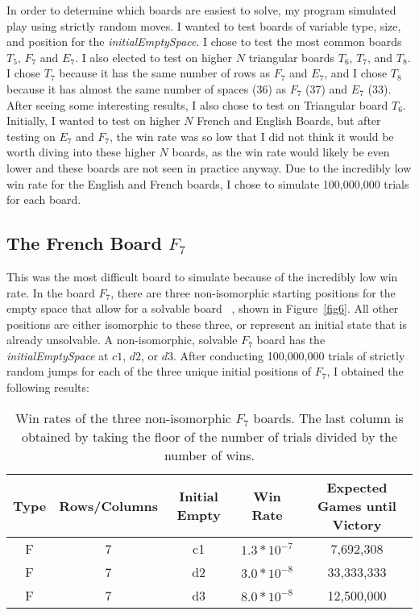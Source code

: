 \documentclass{article}
\begin{document}
In order to determine which boards are easiest to solve, my program simulated play using strictly random moves. I wanted to test boards of variable type, size, and position for the \textit{initialEmptySpace}. I chose to test the most common boards $T_5$, $F_7$ and $E_7$. I also elected to test on higher $N$ triangular boards $T_6$, $T_7$, and $T_8$. I chose $T_7$ because it has the same number of rows as $F_7$ and $E_7$, and I chose $T_8$ because it has almost the same number of spaces (36) as $F_7$ (37) and $E_7$ (33). After seeing some interesting results, I also chose to test on Triangular board $T_6$. Initially, I wanted to test on higher $N$ French and English Boards, but after testing on $E_7$ and $F_7$, the win rate was so low that I did not think it would be worth diving into these higher $N$ boards, as the win rate would likely be even lower and these boards are not seen in practice anyway. Due to the incredibly low win rate for the English and French boards, I chose to simulate 100,000,000 trials for each board.

\subsection{The French Board $F_7$}
\label{3.1FrenchF7}
This was the most difficult board to simulate because of the incredibly low win rate. In the board $F_7$, there are three non-isomorphic starting positions for the empty space that allow for a solvable board ~\cite{Brassine}, shown in Figure~\ref{fig6}. All other positions are either isomorphic to these three, or represent an initial state that is already unsolvable. A non-isomorphic, solvable $F_7$ board has the \textit{initialEmptySpace} at $c1$, $d2$, or $d3$. After conducting 100,000,000 trials of strictly random jumps for each of the three unique initial positions of $F_7$, I obtained the following results:
\begin{table}[htb]
\begin{center} 
\begin{tabular}{ c  c  c  c  c }
\hline
\textbf{Type} & \textbf{Rows/Columns} &\textbf{Initial Empty} & \textbf{Win Rate} & \textbf{Expected Games until Victory}\\
\hline
F & 7 & c1 & $1.3*10^{-7}$ & 7,692,308\\

F & 7 & d2 & $3.0*10^{-8}$ & 33,333,333\\

F & 7 & d3 & $8.0*10^{-8}$ & 12,500,000\\

\end{tabular}
\caption{Win rates of the three non-isomorphic $F_7$ boards. The last column is obtained by taking the floor of the number of trials divided by the number of wins.}
\label{tab1}
\end{center} 
\end{table}
\end{document}
